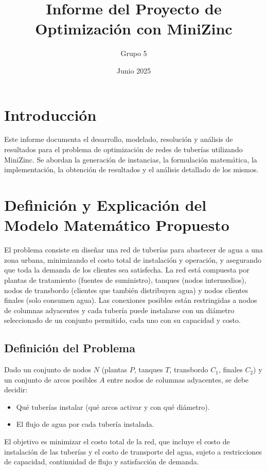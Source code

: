 \documentclass[a4paper,12pt]{article}
\title{Informe del Proyecto de Optimización con MiniZinc}
\author{Grupo 5}
\date{Junio 2025}
\begin{document}
\maketitle

\section{Introducción}
Este informe documenta el desarrollo, modelado, resolución y análisis de resultados para el problema de optimización de redes de tuberías utilizando MiniZinc. Se abordan la generación de instancias, la formulación matemática, la implementación, la obtención de resultados y el análisis detallado de los mismos.

\section{Definición y Explicación del Modelo Matemático Propuesto}

El problema consiste en diseñar una red de tuberías para abastecer de agua a una zona urbana, minimizando el costo total de instalación y operación, y asegurando que toda la demanda de los clientes sea satisfecha. La red está compuesta por plantas de tratamiento (fuentes de suministro), tanques (nodos intermedios), nodos de transbordo (clientes que también distribuyen agua) y nodos clientes finales (solo consumen agua). Las conexiones posibles están restringidas a nodos de columnas adyacentes y cada tubería puede instalarse con un diámetro seleccionado de un conjunto permitido, cada uno con su capacidad y costo.

\subsection{Definición del Problema}

Dado un conjunto de nodos $N$ (plantas $P$, tanques $T$, transbordo $C_1$, finales $C_2$) y un conjunto de arcos posibles $A$ entre nodos de columnas adyacentes, se debe decidir:
\begin{itemize}
    \item Qué tuberías instalar (qué arcos activar y con qué diámetro).
    \item El flujo de agua por cada tubería instalada.
\end{itemize}

El objetivo es minimizar el costo total de la red, que incluye el costo de instalación de las tuberías y el costo de transporte del agua, sujeto a restricciones de capacidad, continuidad de flujo y satisfacción de demanda.
\end{document}

